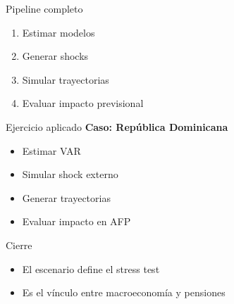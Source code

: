 \documentclass{beamer}
\begin{document}
\begin{frame}{Pipeline completo}
\begin{enumerate}
\item Estimar modelos
\item Generar shocks
\item Simular trayectorias
\item Evaluar impacto previsional
\end{enumerate}
\end{frame}

\begin{frame}{Ejercicio aplicado}
\textbf{Caso: República Dominicana}
\begin{itemize}
\item Estimar VAR
\item Simular shock externo
\item Generar trayectorias
\item Evaluar impacto en AFP
\end{itemize}
\end{frame}

\begin{frame}{Cierre}
\begin{itemize}
\item El escenario define el stress test
\item Es el vínculo entre macroeconomía y pensiones
\end{itemize}
\end{frame}

\end{document}

